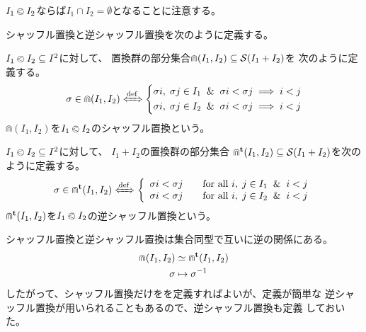 {	$I_1\olessthan I_2$ならば$I_1\cap I_2=\emptyset$となることに注意する。

	シャッフル置換と逆シャッフル置換を次のように定義する。

	\begin{definition}[シャッフル置換]\label{def:シャッフル置換} %
		$I_1\olessthan I_2\subseteq I^2$に対して、
		置換群の部分集合$\Cap(I_1,I_2)\subseteq{\ensuremath{{\mathcal{S}}}}(I_1+I_2)$を
		次のように定義する。
		\begin{equation*}\begin{split}
			\sigma\in \Cap(I_1,I_2) \xIff{\dfn} \left\{\begin{split}{}
				\sigma i,\;\sigma j \in I_1 \And \sigma i < \sigma j
					&\implies i < j \\
				\sigma i,\;\sigma j \in I_2 \And \sigma i < \sigma j
					&\implies i < j \\
			\end{split}\right.
		\end{split}\end{equation*}
		$\Cap(I_1,I_2)$を$I_1\olessthan I_2$のシャッフル置換という。
	\end{definition} %
	\begin{definition}[逆シャッフル置換]\label{def:逆シャッフル置換} %
		$I_1\olessthan I_2\subseteq I^2$に対して、
		$I_1+I_2$の置換群の部分集合
		$\Cap^{\mathbf{t}}(I_1,I_2)\subseteq{\ensuremath{{\mathcal{S}}}}(I_1+I_2)$を次のように定義する。
		\begin{equation*}\begin{split}
			\sigma\in\Cap^\tran(I_1,I_2) \xIff{\dfn} \left\{\begin{array}{ll}
				\sigma i < \sigma j
				& \quad\text{for all } i,\;j \in I_1 \And i < j \\
				\sigma i < \sigma j
				& \quad\text{for all } i,\;j \in I_2 \And i < j \\
			\end{array}\right. \\ %
		\end{split}\end{equation*}
		$\Cap^{\mathbf{t}}(I_1,I_2)$を$I_1\olessthan I_2$の逆シャッフル置換という。
	\end{definition} %

	シャッフル置換と逆シャッフル置換は集合同型で互いに逆の関係にある。
	\begin{equation*}\begin{split}
		\Cap(I_1,I_2) &\simeq \Cap^{\mathbf{t}}(I_1,I_2) \\
		\sigma &\mapsto \sigma^{-1}
	\end{split}\end{equation*}
	したがって、シャッフル置換だけをを定義すればよいが、定義が簡単な
	逆シャッフル置換が用いられることもあるので、逆シャッフル置換も定義
	しておいた。

}
